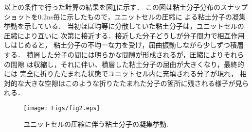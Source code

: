 以上の条件で行った計算の結果を図\ref{fig:fig2}に示す．
この図は粘土分子分布のスナップショットを0.2ns毎に示したもので，ユニットセルの圧縮に
よる粘土分子の凝集挙動を示している．
当初ほぼ均等に分散していた粘土分子は，ユニットセルの圧縮により互いに
次第に接近する．接近した分子どうしが分子間力で相互作用しはじめると，
粘土分子の不均一な力を受け，屈曲振動しながら少しずつ積層する．
積層した分子の間には明らかな間隙が形成されるが，圧縮によりそれらの間隙
は収縮し，それに伴い、積層した粘土分子の屈曲が大きくなり，最終的には
完全に折りたたまれた状態でユニットセル内に充填される分子が現れ，
相対的な大きな空隙はこのような折りたたまれた分子の箇所に残される様子が見られる．
\begin{figure}[h]
	\begin{center}
	\texttt{[image: Figs/fig2.eps]} 
	\end{center}
	\caption{
		ユニットセルの圧縮に伴う粘土分子の凝集挙動.
	} 
	\label{fig:fig2}
\end{figure}
